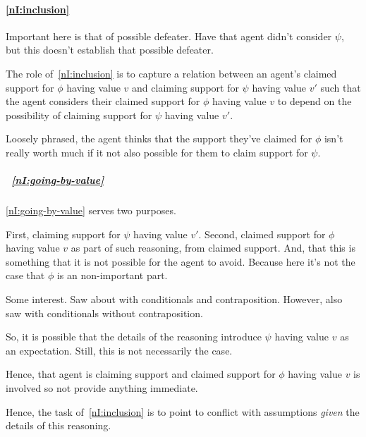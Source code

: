 \paragraph{\ref{nI:inclusion}}

\begin{note}
  Important here is that of possible defeater.
  Have that agent didn't consider \(\psi\), but this doesn't establish that possible defeater.
\end{note}

\begin{note}
  The role of~\ref{nI:inclusion} is to capture a relation between an agent's claimed support for \(\phi\) having value \(v\) and claiming support for \(\psi\) having value \(v'\) such that the agent considers their claimed support for \(\phi\) having value \(v\) to depend on the possibility of claiming support for \(\psi\) having value \(v'\).

  Loosely phrased, the agent thinks that the support they've claimed for \(\phi\) isn't really worth much if it not also possible for them to claim support for \(\psi\).
\end{note}



\subparagraph{~\ref{nI:going-by-value}}

\begin{note}
  \ref{nI:going-by-value} serves two purposes.

  First, claiming support for \(\psi\) having value \(v'\).
  Second, claimed support for \(\phi\) having value \(v\) as part of such reasoning, from claimed support.
  And, that this is something that it is not possible for the agent to avoid.
  {
    \color{red} Because here it's not the case that \(\phi\) is an non-important part.
  }

  Some interest.
  Saw about with conditionals and contraposition.
  However, also saw with conditionals without contraposition.

  So, it is possible that the details of the reasoning introduce \(\psi\) having value \(v\) as an expectation.
  Still, this is not necessarily the case.

  Hence, that agent is claiming support and claimed support for \(\phi\) having value \(v\) is involved so not provide anything immediate.

  Hence, the task of~\ref{nI:inclusion} is to point to conflict with assumptions \emph{given} the details of this reasoning.
\end{note}

